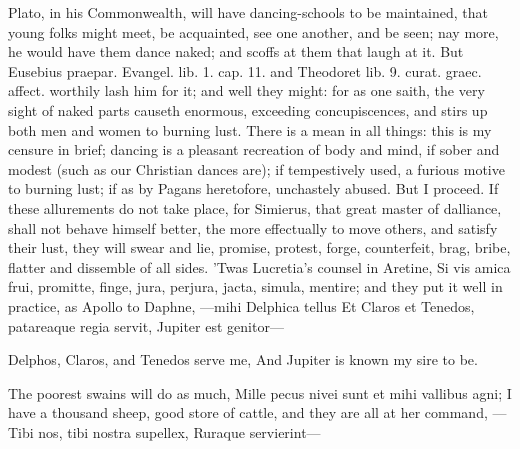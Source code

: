 {Plato, in his Commonwealth, will have dancing-schools to be
maintained, that young folks might meet, be acquainted, see one
another, and be seen; nay more, he would have them dance naked; and
scoffs at them that laugh at it. But Eusebius praepar. Evangel. lib. 1.
cap. 11. and Theodoret lib. 9. curat. graec. affect. worthily lash him
for it; and well they might: for as one saith, the very sight of
naked parts causeth enormous, exceeding concupiscences, and stirs up
both men and women to burning lust. There is a mean in all things: this
is my censure in brief; dancing is a pleasant recreation of body and
mind, if sober and modest (such as our Christian dances are); if
tempestively used, a furious motive to burning lust; if as by Pagans
heretofore, unchastely abused. But I proceed.
If these allurements do not take place, for Simierus, that great
master of dalliance, shall not behave himself better, the more
effectually to move others, and satisfy their lust, they will swear and
lie, promise, protest, forge, counterfeit, brag, bribe, flatter and
dissemble of all sides. 'Twas Lucretia's counsel in Aretine, Si vis
amica frui, promitte, finge, jura, perjura, jacta, simula, mentire; and
they put it well in practice, as Apollo to Daphne,
---mihi Delphica tellus
Et Claros et Tenedos, patareaque regia servit,
Jupiter est genitor---

Delphos, Claros, and Tenedos serve me,
And Jupiter is known my sire to be.

The poorest swains will do as much, Mille pecus nivei sunt
et mihi vallibus agni; I have a thousand sheep, good store of cattle,
and they are all at her command,
---Tibi nos, tibi nostra supellex,
Ruraque servierint---

}
